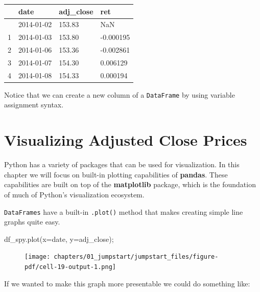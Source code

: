 \documentclass[
  letterpaper,
  DIV=11,
  numbers=noendperiod]{scrreprt}
\newenvironment{Shaded}{\begin{snugshade}}{\end{snugshade}}
\newcommand{\NormalTok}[1]{\textcolor[rgb]{0.00,0.23,0.31}{#1}}
\newcommand{\OperatorTok}[1]{\textcolor[rgb]{0.37,0.37,0.37}{#1}}
\newcommand{\StringTok}[1]{\textcolor[rgb]{0.13,0.47,0.30}{#1}}
\begin{document}
\begin{longtable}[]{@{}llll@{}}
\toprule\noalign{}
& date & adj\_close & ret \\
\midrule\noalign{}
\endhead
\bottomrule\noalign{}
\endlastfoot
0 & 2014-01-02 & 153.83 & NaN \\
1 & 2014-01-03 & 153.80 & -0.000195 \\
2 & 2014-01-06 & 153.36 & -0.002861 \\
3 & 2014-01-07 & 154.30 & 0.006129 \\
4 & 2014-01-08 & 154.33 & 0.000194 \\
\end{longtable}

Notice that we can create a new column of a \texttt{DataFrame} by using
variable assignment syntax.

\hypertarget{visualizing-adjusted-close-prices}{%
\section{Visualizing Adjusted Close
Prices}\label{visualizing-adjusted-close-prices}}

Python has a variety of packages that can be used for visualization. In
this chapter we will focus on built-in plotting capabilities of
\textbf{pandas}. These capabilities are built on top of the
\textbf{matplotlib} package, which is the foundation of much of Python's
visualization ecosystem.

\texttt{DataFrames} have a built-in \texttt{.plot()} method that makes
creating simple line graphs quite easy.

\begin{Shaded}
\begin{Highlighting}[]
\NormalTok{df\_spy.plot(x}\OperatorTok{=}\StringTok{\textquotesingle{}date\textquotesingle{}}\NormalTok{, y}\OperatorTok{=}\StringTok{\textquotesingle{}adj\_close\textquotesingle{}}\NormalTok{)}\OperatorTok{;}
\end{Highlighting}
\end{Shaded}

\begin{figure}[H]

{\centering \texttt{[image: chapters/01\_jumpstart/jumpstart\_files/figure-pdf/cell-19-output-1.png]}

}

\end{figure}

If we wanted to make this graph more presentable we could do something
like:
\end{document}
